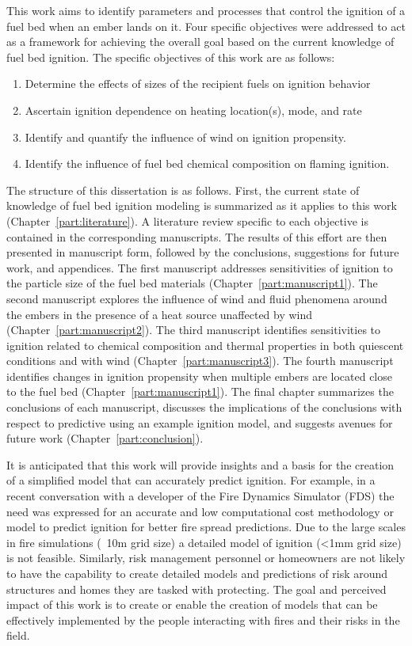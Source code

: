     This work aims to identify parameters and processes that control the ignition of a fuel bed when an ember lands on it. Four specific objectives were addressed to act as a framework for achieving the overall goal based on the current knowledge of fuel bed ignition. The specific objectives of this work are as follows:
        \begin{enumerate}
            \item Determine the effects of sizes of the recipient fuels on ignition behavior
            \item Ascertain ignition dependence on heating location(s), mode, and rate
            \item Identify and quantify the influence of wind on ignition propensity.
            \item Identify the influence of fuel bed chemical composition on flaming ignition.
        \end{enumerate}
    The structure of this dissertation is as follows. First, the current state of knowledge of fuel bed ignition modeling is summarized as it applies to this work (Chapter~\ref{part:literature}). A literature review specific to each objective is contained in the corresponding manuscripts. The results of this effort are then presented in manuscript form, followed by the conclusions, suggestions for future work, and appendices. The first manuscript addresses sensitivities of ignition to the particle size of the fuel bed materials (Chapter~\ref{part:manuscript1}). The second manuscript explores the influence of wind and fluid phenomena around the embers in the presence of a heat source unaffected by wind (Chapter~\ref{part:manuscript2}). The third manuscript identifies sensitivities to ignition related to chemical composition and thermal properties in both quiescent conditions and with wind (Chapter~\ref{part:manuscript3}). The fourth manuscript identifies changes in ignition propensity when multiple embers are located close to the fuel bed (Chapter~\ref{part:manuscript1}). The final chapter summarizes the conclusions of each manuscript, discusses the implications of the conclusions with respect to predictive using an example ignition model, and suggests avenues for future work (Chapter~\ref{part:conclusion}). 
    
    It is anticipated that this work will provide insights and a basis for the creation of a simplified model that can accurately predict ignition. For example, in a recent conversation with a developer of the Fire Dynamics Simulator (FDS) the need was expressed for an accurate and low computational cost methodology or model to predict ignition for better fire spread predictions. Due to the large scales in fire simulations (~10\si{\meter} grid size) a detailed model of ignition (<1\si{\milli\meter} grid size) is not feasible. Similarly, risk management personnel or homeowners are not likely to have the capability to create detailed models and predictions of risk around structures and homes they are tasked with protecting. The goal and perceived impact of this work is to create or enable the creation of models that can be effectively implemented by the people interacting with fires and their risks in the field. 